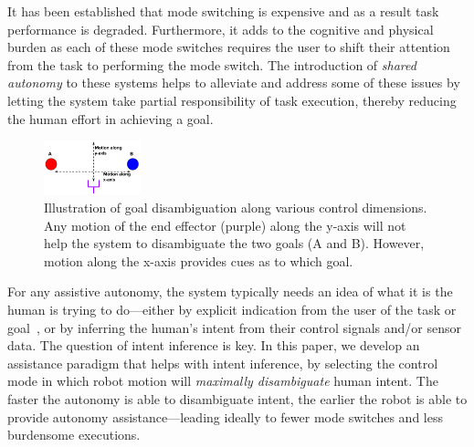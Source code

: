 \documentclass[conference]{IEEEtran}
\begin{document}
It has been established that mode switching is expensive and as a result task performance is degraded. Furthermore, it adds to the cognitive and physical burden as each of these mode switches requires the user to shift their attention from the task to performing the mode switch. The introduction of \textit{shared autonomy} to these systems helps to alleviate and address some of these issues by letting the system take partial responsibility of task execution, thereby reducing the human effort in achieving a goal. 
\begin{figure}
	\begin{center}
		\vspace{-0.8cm}
		\includegraphics[width=0.25\textwidth]{./figures/DE_NEW2.png}
	\end{center}
	\vspace{-.45cm}
	\caption{Illustration of goal disambiguation along various control dimensions. Any motion of the end effector (purple) along the y-axis will not help the system to disambiguate the two goals (A and B). However, motion along the x-axis provides cues as to which goal.}
	\label{DE}
\end{figure}
For any assistive autonomy, the system typically needs an idea of what it is the human is trying to do---either by explicit indication from the user of the task or goal~\cite{choi2008laser}, or by inferring the human's intent from their control signals and/or sensor data. The question of intent inference is key. In this paper, we develop an assistance paradigm that helps with intent inference, by selecting the control mode in which robot motion will \textit{maximally disambiguate} human intent. The faster the autonomy is able to disambiguate intent, the earlier the robot is able to provide autonomy assistance---leading ideally to fewer mode switches and less burdensome executions. 
\end{document}
